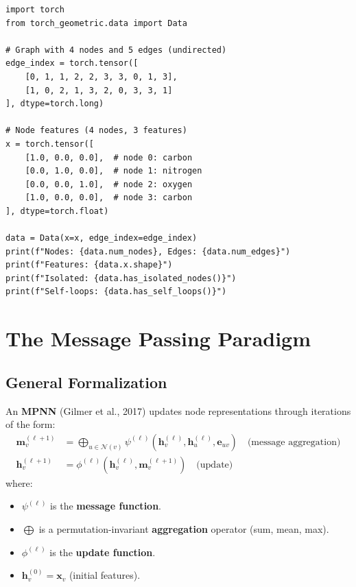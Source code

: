 \begin{codeblock}[title=\textbf{Graph representation in PyTorch Geometric}]
\begin{verbatim}
import torch
from torch_geometric.data import Data

# Graph with 4 nodes and 5 edges (undirected)
edge_index = torch.tensor([
    [0, 1, 1, 2, 2, 3, 3, 0, 1, 3],
    [1, 0, 2, 1, 3, 2, 0, 3, 3, 1]
], dtype=torch.long)

# Node features (4 nodes, 3 features)
x = torch.tensor([
    [1.0, 0.0, 0.0],  # node 0: carbon
    [0.0, 1.0, 0.0],  # node 1: nitrogen
    [0.0, 0.0, 1.0],  # node 2: oxygen
    [1.0, 0.0, 0.0],  # node 3: carbon
], dtype=torch.float)

data = Data(x=x, edge_index=edge_index)
print(f"Nodes: {data.num_nodes}, Edges: {data.num_edges}")
print(f"Features: {data.x.shape}")
print(f"Isolated: {data.has_isolated_nodes()}")
print(f"Self-loops: {data.has_self_loops()}")
\end{verbatim}
\end{codeblock}

\section{The Message Passing Paradigm}

\subsection{General Formalization}

\begin{definition}
An \textbf{MPNN} (Gilmer et al., 2017) updates node representations through
iterations of the form:
\begin{align}
    \mathbf{m}_v^{(\ell+1)} &= \bigoplus_{u \in \mathcal{N}(v)}
    \psi^{(\ell)}\!\left(\mathbf{h}_v^{(\ell)}, \mathbf{h}_u^{(\ell)},
    \mathbf{e}_{uv}\right) \quad \text{(message aggregation)} \label{eq:mpnn_agg} \\
    \mathbf{h}_v^{(\ell+1)} &= \phi^{(\ell)}\!\left(\mathbf{h}_v^{(\ell)},
    \mathbf{m}_v^{(\ell+1)}\right) \quad \text{(update)} \label{eq:mpnn_upd}
\end{align}
where:
\begin{itemize}
    \item $\psi^{(\ell)}$ is the \textbf{message function}.
    \item $\bigoplus$ is a permutation-invariant \textbf{aggregation} operator
          (sum, mean, max).
    \item $\phi^{(\ell)}$ is the \textbf{update function}.
    \item $\mathbf{h}_v^{(0)} = \mathbf{x}_v$ (initial features).
\end{itemize}
\end{definition}

